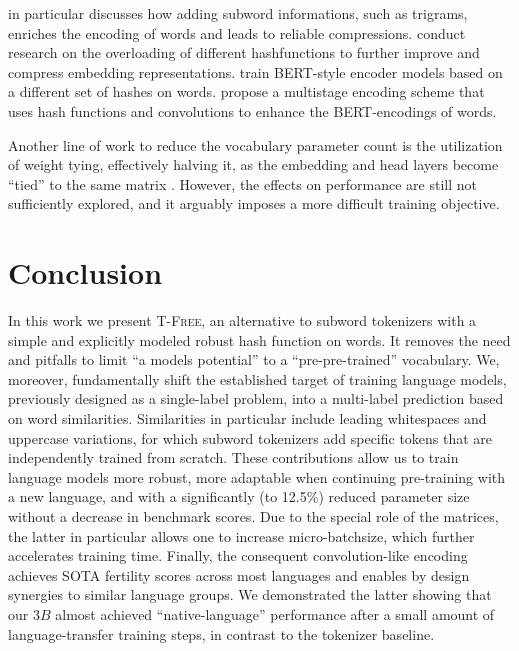 \documentclass[11pt]{article}
\newcommand\todo[1]{\textcolor{red}{#1}}
\newcommand{\method}{\textsc{T-Free}}
\begin{document}
\citet{fasttext} in particular discusses how adding subword informations, such as trigrams, enriches the encoding of words and leads to reliable compressions. \citet{hashembed} conduct research on the overloading of different hashfunctions to further improve and compress embedding representations. \citet{hashformer} train BERT-style encoder models based on a different set of hashes on words. \citet{canine} propose a multistage encoding scheme that uses hash functions and convolutions to enhance the BERT-encodings of words.


Another line of work to reduce the vocabulary parameter count is the utilization of weight tying, effectively halving it, as  the embedding and head layers become ``tied'' to the same matrix  \cite{press2017using}. 
However, the effects on performance are still not sufficiently explored, and it arguably imposes a more difficult training objective. 


\section{Conclusion}
\label{sec:conclusion}
In this work we present \method, an alternative to subword tokenizers with a simple and explicitly modeled robust hash function on words. It removes the need and pitfalls to limit ``a models potential'' to a ``pre-pre-trained'' vocabulary.
We, moreover, fundamentally shift the established target of training language models, previously designed as a single-label problem, into a multi-label prediction based on word similarities.
Similarities in particular include leading whitespaces and uppercase variations, for which subword tokenizers add specific tokens that are independently trained from scratch.
These contributions allow us to train language models more robust, more adaptable when continuing pre-training with a new language, and with a significantly (to 12.5\%) reduced parameter size without a decrease in benchmark scores. Due to the special role of the matrices, the latter in particular allows one to increase micro-batchsize, which further accelerates training time.
Finally, the consequent convolution-like encoding achieves SOTA fertility scores across most languages and enables by design synergies to similar language groups.
We demonstrated the latter showing that our $3B$ almost achieved ``native-language'' performance after a small amount of language-transfer training steps, in contrast to the tokenizer baseline.
\end{document}
